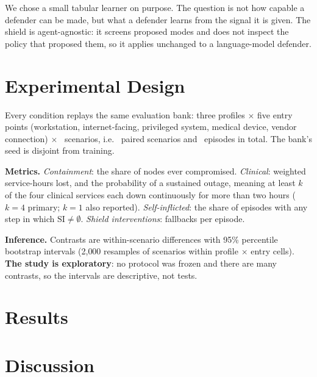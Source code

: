 \documentclass[conference,compsoc]{IEEEtran}
\begin{document}
We chose a small tabular learner on purpose. The question is not how
capable a defender can be made, but what a defender learns from the signal
it is given. The shield is agent-agnostic: it screens proposed modes and
does not inspect the policy that proposed them, so it applies unchanged
to a language-model defender.

\section{Experimental Design}
\label{sec:design}

Every condition replays the same evaluation bank: three profiles $\times$
five entry points (workstation, internet-facing, privileged system, medical
device, vendor connection) $\times$ \numScenariosPerCell\ scenarios, i.e.
\numEvalScenarios\ paired scenarios and \numEpisodes\ episodes in total.
The bank's seed is disjoint from training.

\textbf{Metrics.} \emph{Containment}: the share of nodes ever compromised.
\emph{Clinical}: weighted service-hours lost, and the probability of a
sustained outage, meaning at least $k$ of the four clinical services each
down continuously for more than two hours ($k=4$ primary; $k=1$ also
reported). \emph{Self-inflicted}: the share of episodes with any step in
which $\mathrm{SI}\neq\emptyset$. \emph{Shield interventions}: fallbacks per episode.

\textbf{Inference.} Contrasts are within-scenario differences with 95\%
percentile bootstrap intervals (2{,}000 resamples of scenarios within
profile $\times$ entry cells). \textbf{The study is exploratory}: no protocol
was frozen and there are many contrasts, so the intervals are descriptive,
not tests.

\section{Results}
\label{sec:results}



\section{Discussion}
\label{sec:discussion}
\end{document}
